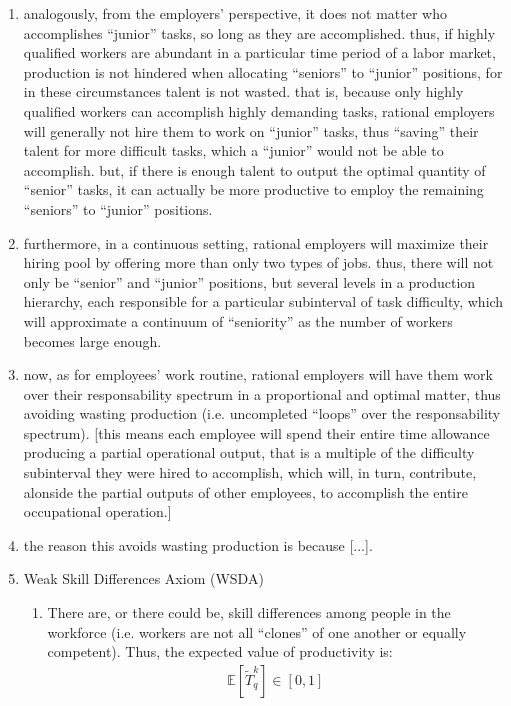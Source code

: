 \documentclass[hidelinks, nonatbib]{elsarticle}
\begin{document}
\begin{enumerate}
    \item analogously, from the employers' perspective, it does not matter who accomplishes ``junior'' tasks, so long as they are accomplished. thus, if highly qualified workers are abundant in a particular time period of a labor market, production is not hindered when allocating ``seniors'' to ``junior'' positions, for in these circumstances talent is not wasted. that is, because only highly qualified workers can accomplish highly demanding tasks, rational employers will generally not hire them to work on ``junior'' tasks, thus ``saving'' their talent for more difficult tasks, which a ``junior'' would not be able to accomplish. but, if there is enough talent to output the optimal quantity of ``senior'' tasks, it can actually be more productive to employ the remaining ``seniors'' to ``junior'' positions.
    \item furthermore, in a continuous setting, rational employers will maximize their hiring pool by offering more than only two types of jobs. thus, there will not only be ``senior'' and ``junior'' positions, but several levels in a production hierarchy, each responsible for a particular subinterval of task difficulty, which will approximate a continuum of ``seniority'' as the number of workers becomes large enough.
    \item now, as for employees' work routine, rational employers will have them work over their responsability spectrum in a proportional and optimal matter, thus avoiding wasting production (i.e. uncompleted ``loops'' over the responsability spectrum). [this means each employee will spend their entire time allowance producing a partial operational output, that is a multiple of the difficulty subinterval they were hired to accomplish, which will, in turn, contribute, alonside the partial outputs of other employees, to accomplish the entire occupational operation.]
    \item the reason this avoids wasting production is because [...].
    \item Weak Skill Differences Axiom (WSDA)
    \begin{enumerate}
        \item There are, or there could be, skill differences among people in the workforce (i.e. workers are not all ``clones'' of one another or equally competent). Thus, the expected value of productivity is:
        \begin{gather}
            \mathbb{E}[
                \tilde{T}_{q}^{k}
            ]
            \in
            [0,1]

\end{gather}
\end{enumerate}
\end{enumerate}
\end{document}
